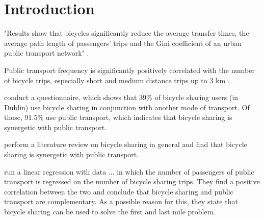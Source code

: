 \clearpage
\section{Introduction}
\label{sec:introduction}


"Results show that bicycles significantly reduce the average transfer times, the
average path length of passengers’ trips and the Gini coefficient of an urban
public transport network" \cite{yangImpactPublicBicyclesharing2018}.

Public transport frequency is significantly positively correlated with the number
of bicycle trips, especially short and medium distance trips up to 3 km
\cite{radzimskiExploringRelationshipBikesharing2021a}.

\cite{murphyRoleBicyclesharingCity2015} conduct a questionnaire, which shows
that 39\% of bicycle sharing users (in Dublin) use bicycle sharing in conjunction
with another mode of transport. Of those, 91.5\% use public transport, which
indicates that bicycle sharing is synergetic with public transport.

\cite{fishmanBikeShareSynthesis2013} perform a literature review on bicycle
sharing in general and find that bicycle sharing is synergetic with public
transport.

\cite{maBicycleSharingPublic2015} run a linear regression with data ... in which
the number of passengers of public transport is regressed on the number of
bicycle sharing trips. They find a positive correlation between the two and
conclude that bicycle sharing and public transport are complementary. As a
possible reason for this, they state that bicycle sharing can be used to solve
the first and last mile problem.


